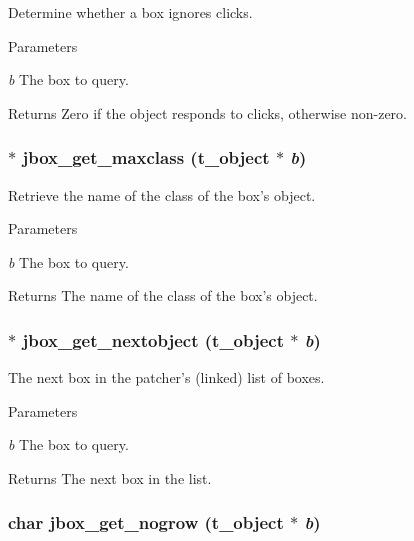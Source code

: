 Determine whether a box ignores clicks. 
\begin{DoxyParams}{Parameters}
\item[{\em b}]The box to query. \end{DoxyParams}
\begin{DoxyReturn}{Returns}
Zero if the object responds to clicks, otherwise non-\/zero. 
\end{DoxyReturn}
\hypertarget{group__jbox_ga0c96d89b3e16930d8c84e4a39b21b639}{
\subsubsection[{jbox\_\-get\_\-maxclass}]{$\ast$ jbox\_\-get\_\-maxclass ({\bf t\_\-object} $\ast$ {\em b})}}
\label{group__jbox_ga0c96d89b3e16930d8c84e4a39b21b639}


Retrieve the name of the class of the box's object. 
\begin{DoxyParams}{Parameters}
\item[{\em b}]The box to query. \end{DoxyParams}
\begin{DoxyReturn}{Returns}
The name of the class of the box's object. 
\end{DoxyReturn}
\hypertarget{group__jbox_ga89177ab12d45649c7209e65c97a3b128}{
\subsubsection[{jbox\_\-get\_\-nextobject}]{$\ast$ jbox\_\-get\_\-nextobject ({\bf t\_\-object} $\ast$ {\em b})}}
\label{group__jbox_ga89177ab12d45649c7209e65c97a3b128}


The next box in the patcher's (linked) list of boxes. 
\begin{DoxyParams}{Parameters}
\item[{\em b}]The box to query. \end{DoxyParams}
\begin{DoxyReturn}{Returns}
The next box in the list. 
\end{DoxyReturn}
\hypertarget{group__jbox_gaae265845c184a54b16ecf19cff0f7b91}{
\subsubsection[{jbox\_\-get\_\-nogrow}]{\setlength{\rightskip}{0pt plus 5cm}char jbox\_\-get\_\-nogrow ({\bf t\_\-object} $\ast$ {\em b})}}
\label{group__jbox_gaae265845c184a54b16ecf19cff0f7b91}


